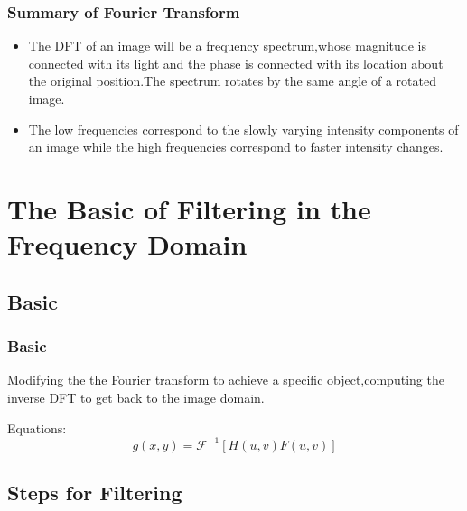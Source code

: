 \documentclass[notheorems, serif, table, compress]{beamer}  %
\begin{document}
\begin{frame}
\frametitle{Summary of Fourier Transform}
\begin{itemize}
\item The DFT of an image will be a frequency spectrum,whose magnitude is connected with its light and the phase is connected with its location about the original position.The spectrum rotates by the same angle of a rotated image.

\item The low frequencies correspond to the slowly varying intensity components of an image while the high frequencies correspond to faster intensity changes. 

\end{itemize}
 \end{frame}

\section{The Basic of Filtering in the Frequency Domain} %

\subsection{Basic}
\begin{frame}
\frametitle{Basic}

Modifying the the Fourier transform to achieve a specific object,computing the inverse DFT to get back to the image domain.

Equations:
   \begin{equation}    \label{11} %
    g(x,y)=\mathscr{F}^{-1}[H(u,v)F(u,v)]
   \end{equation}

 \end{frame}

\subsection{Steps for Filtering}%
\end{document}
